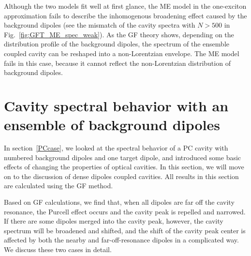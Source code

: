 Although the two models fit well at first glance, the ME model in the one-exciton approximation fails to describe the inhomogenous broadening effect caused by the background dipoles (see the mismatch of the cavity spectra with $N>500$ in Fig.~\ref{fig:GFT_ME_spec_weak}). As the GF theory shows, depending on the distribution profile of the background dipoles, the spectrum of the ensemble coupled cavity can be reshaped into a non-Lorentzian envelope. The ME model fails in this case, because it cannot reflect the non-Lorentzian distribution of background dipoles.





\section{Cavity spectral behavior with an ensemble of background dipoles}



In section~\ref{PCcase}, we looked at the spectral behavior of a PC cavity with numbered background dipoles and one target dipole, and introduced some basic effects of changing the properties of optical cavities. In this section, we will move on to the discussion of dense dipoles coupled cavities. All results in this section are calculated using the GF method.



Based on GF calculations, we find that, when all dipoles are far off the cavity resonance, the Purcell effect occurs and the cavity peak is repelled and narrowed. If there are some dipoles merged into the cavity peak, however, the cavity spectrum will be broadened and shifted, and the shift of the cavity peak center is affected by both the nearby and far-off-resonance dipoles in a complicated way. We discuss these two cases in detail.

